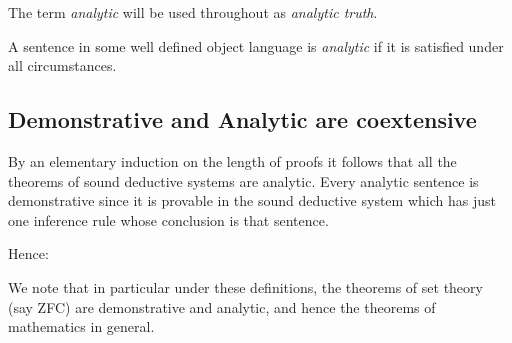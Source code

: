 \documentclass[numreferences]{rbjk}
\newcommand{\ignore}[1]{}
\begin{document}
\begin{article}
The term {\it analytic} will be used throughout as {\it analytic truth}.

A sentence in some well defined object language is {\it analytic} if it is satisfied under all circumstances.

\subsection{Demonstrative and Analytic are coextensive}

By an elementary induction on the length of proofs it follows that all the theorems of sound deductive systems are analytic.
Every analytic sentence is demonstrative since it is provable in the sound deductive system which has just one inference rule whose conclusion is that sentence.

Hence:

We note that in particular under these definitions, the theorems of set theory (say ZFC) are demonstrative and analytic, and hence the theorems of mathematics in general.

\ignore{

\subsection{Reasoning about the Contingent World}

Firstly it should break down where a formal calculus is devised for reasoning about the real world.
For in this case we would expect to use axioms which are not known to be true on the basis of the semantics of the language alone (i.e. which are not analytic), and to soundly derive conclusions whose truth is contingent.
Even in this case the metatheoretic methodology has some merit but must properly be described in different terms.
One important purpose served by the method is to establish the consistency of the logical system.
By showing that all the derivable theorems are {\it true} it is demonstrated that no contradiction is derivable in the system.
For this purpose it is desirable to {\it concoct} a semantics relative to which the system is sound, even if this semantics distorts the meaning of the sentences, for example, by restricting the domain of discourse.
Thus a deductive system which incorporates physical laws may be evaluated as if those physical laws were incorporated into the meaning of the language.
A second reason for gerrymandering semantics is in connection with completeness.
In this case a domain of discourse may be chosen which is broader than might otherwise have been expected, in order to obtain a completeness result for the deductive system.
An example of this is in the non-standard semantics of higher order logics, in which a broader class of interpretations is admitted, fewer inferences are sound, in particular eliminating any which do no correspond to formal derivations.

}
\end{article}
\end{document}
